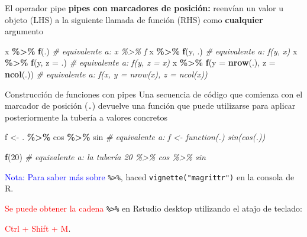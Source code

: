 \documentclass[
  ignorenonframetext,
  aspectratio=169]{beamer}
\newenvironment{Shaded}{\begin{snugshade}}{\end{snugshade}}
\newcommand{\AttributeTok}[1]{\textcolor[rgb]{0.13,0.29,0.53}{#1}}
\newcommand{\CommentTok}[1]{\textcolor[rgb]{0.56,0.35,0.01}{\textit{#1}}}
\newcommand{\DecValTok}[1]{\textcolor[rgb]{0.00,0.00,0.81}{#1}}
\newcommand{\FunctionTok}[1]{\textcolor[rgb]{0.13,0.29,0.53}{\textbf{#1}}}
\newcommand{\NormalTok}[1]{#1}
\newcommand{\OtherTok}[1]{\textcolor[rgb]{0.56,0.35,0.01}{#1}}
\newcommand{\SpecialCharTok}[1]{\textcolor[rgb]{0.81,0.36,0.00}{\textbf{#1}}}
\newcommand\blue[1]{\textcolor{blue}{#1}}
\newcommand\red[1]{\textcolor{red}{#1}}
\begin{document}
\begin{frame}[fragile]{El operador pipe}
\label{el-operador-pipe-1}
\textbf{pipes con marcadores de posición:} reenvían un valor u objeto
(LHS) a la siguiente llamada de función (RHS) como \textbf{cualquier}
argumento

\begin{Shaded}
\begin{Highlighting}[]
\NormalTok{x }\SpecialCharTok{\%\textgreater{}\%} \FunctionTok{f}\NormalTok{(.) }\CommentTok{\# equivalente a: x \%\textgreater{}\% f}
\NormalTok{x }\SpecialCharTok{\%\textgreater{}\%} \FunctionTok{f}\NormalTok{(y, .) }\CommentTok{\# equivalente a: f(y, x)}
\NormalTok{x }\SpecialCharTok{\%\textgreater{}\%} \FunctionTok{f}\NormalTok{(y, }\AttributeTok{z =}\NormalTok{ .) }\CommentTok{\# equivalente a: f(y, z = x)}
\NormalTok{x }\SpecialCharTok{\%\textgreater{}\%} \FunctionTok{f}\NormalTok{(}\AttributeTok{y =} \FunctionTok{nrow}\NormalTok{(.),}
        \AttributeTok{z =} \FunctionTok{ncol}\NormalTok{(.))  }\CommentTok{\# equivalente a: f(x, y = nrow(x), z = ncol(x))}
\end{Highlighting}
\end{Shaded}
\end{frame}

\begin{frame}[fragile]{Construcción de funciones con pipes}
\label{construcciuxf3n-de-funciones-con-pipes}
Una secuencia de código que comienza con el marcador de posición
(\texttt{.}) devuelve una función que puede utilizarse para aplicar
posteriormente la tubería a valores concretos

\begin{Shaded}
\begin{Highlighting}[]
\NormalTok{f }\OtherTok{\textless{}{-}}\NormalTok{ . }\SpecialCharTok{\%\textgreater{}\%}\NormalTok{ cos }\SpecialCharTok{\%\textgreater{}\%}\NormalTok{ sin }\CommentTok{\# equivalente a: f \textless{}{-} function(.) sin(cos(.))}
\end{Highlighting}
\end{Shaded}

\begin{Shaded}
\begin{Highlighting}[]
\FunctionTok{f}\NormalTok{(}\DecValTok{20}\NormalTok{) }\CommentTok{\# equivalente a: la tubería 20 \%\textgreater{}\% cos \%\textgreater{}\% sin}
\end{Highlighting}
\end{Shaded}

\blue{Nota: Para saber más sobre} \texttt{\%\textgreater{}\%}, haced
\texttt{vignette("magrittr")} en la consola de R.

\red{Se puede obtener la cadena} \texttt{\%\textgreater{}\%} en Rstudio
desktop utilizando el atajo de teclado:

\red{Ctrl + Shift  + M}.
\end{frame}
\end{document}
